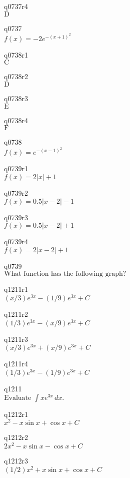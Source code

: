 q0737r4\\
\(\displaystyle \text{D} \)

q0737\\
\(\displaystyle f(x) = -2e^{-(x+1)^2} \)

q0738r1\\
\(\displaystyle \text{C} \)

q0738r2\\
\(\displaystyle \text{D} \)

q0738r3\\
\(\displaystyle \text{E} \)

q0738r4\\
\(\displaystyle \text{F} \)

q0738\\
\(\displaystyle f(x) = e^{-(x-1)^2} \)

q0739r1\\
\(\displaystyle f(x) = 2|x| + 1 \)

q0739r2\\
\(\displaystyle f(x) = 0.5|x-2| - 1 \)

q0739r3\\
\(\displaystyle f(x) = 0.5|x-2| + 1 \)

q0739r4\\
\(\displaystyle f(x) = 2|x-2| + 1 \)

q0739\\
\(\displaystyle \text{What function has the following graph?} \)

q1211r1\\
\(\displaystyle (x/3) e^{3x} - (1/9)e^{3x} + C \)

q1211r2\\
\(\displaystyle (1/3)e^{3x} - (x/9)e^{3x} + C \)

q1211r3\\
\(\displaystyle (x/3)e^{3x} + (x/9)e^{3x} + C \)

q1211r4\\
\(\displaystyle (1/3)e^{3x} - (1/9)e^{3x} + C \)

q1211\\
\(\displaystyle \text{Evaluate } \int x e^{3x}\,dx. \)

q1212r1\\
\(\displaystyle x^2 - x\sin x + \cos x + C \)

q1212r2\\
\(\displaystyle 2x^2 - x\sin x - \cos x + C \)

q1212r3\\
\(\displaystyle (1/2)x^2 + x \sin x + \cos x + C \)

